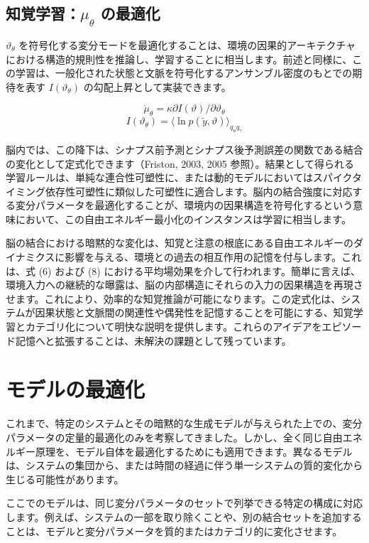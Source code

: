 \documentclass{article}
\begin{document}
\subsection{知覚学習：$\mu_\theta$ の最適化}
$\vartheta_\theta$ を符号化する変分モードを最適化することは、環境の因果的アーキテクチャにおける構造的規則性を推論し、学習することに相当します。前述と同様に、この学習は、一般化された状態と文脈を符号化するアンサンブル密度のもとでの期待を表す $I(\vartheta_\theta)$ の勾配上昇として実装できます。

$$\dot{\mu}_\theta=\kappa\partial I(\vartheta)/\partial\vartheta_\theta$$
$$I(\vartheta_\theta)=\langle\ln p(\tilde{y},\vartheta)\rangle_{q_u q_\gamma}$$

脳内では、この降下は、シナプス前予測とシナプス後予測誤差の関数である結合の変化として定式化できます（Friston, 2003, 2005 参照）。結果として得られる学習ルールは、単純な連合性可塑性に、または動的モデルにおいてはスパイクタイミング依存性可塑性に類似した可塑性に適合します。脳内の結合強度に対応する変分パラメータを最適化することが、環境内の因果構造を符号化するという意味において、この自由エネルギー最小化のインスタンスは学習に相当します。

脳の結合における暗黙的な変化は、知覚と注意の根底にある自由エネルギーのダイナミクスに影響を与える、環境との過去の相互作用の記憶を付与します。これは、式 (6) および (8) における平均場効果を介して行われます。簡単に言えば、環境入力への継続的な曝露は、脳の内部構造にそれらの入力の因果構造を再現させます。これにより、効率的な知覚推論が可能になります。この定式化は、システムが因果状態と文脈間の関連性や偶発性を記憶することを可能にする、知覚学習とカテゴリ化について明快な説明を提供します。これらのアイデアをエピソード記憶へと拡張することは、未解決の課題として残っています。


\section{モデルの最適化}
これまで、特定のシステムとその暗黙的な生成モデルが与えられた上での、変分パラメータの定量的最適化のみを考察してきました。しかし、全く同じ自由エネルギー原理を、モデル自体を最適化するためにも適用できます。異なるモデルは、システムの集団から、または時間の経過に伴う単一システムの質的変化から生じる可能性があります。

ここでのモデルは、同じ変分パラメータのセットで列挙できる特定の構成に対応します。例えば、システムの一部を取り除くことや、別の結合セットを追加することは、モデルと変分パラメータを質的またはカテゴリ的に変化させます。
\end{document}
